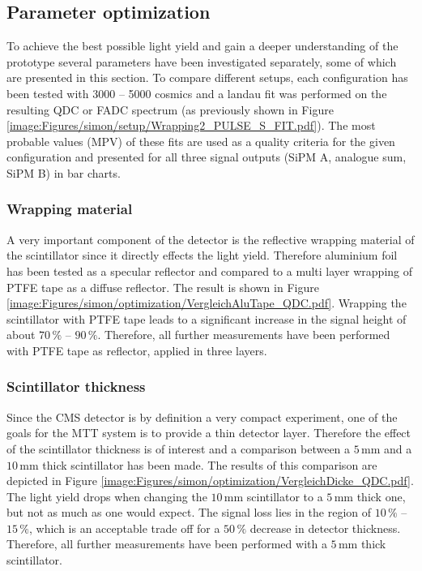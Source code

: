 \subsection{Parameter optimization}
\label{section:simon/optimization}
To achieve the best possible light yield and gain a deeper understanding of the prototype several parameters have been investigated separately, some of which are presented in this section. To compare different setups, each configuration has been tested with 3000 -- 5000 cosmics and a landau fit was performed on the resulting QDC or FADC spectrum (as previously shown in Figure \ref{image:Figures/simon/setup/Wrapping2_PULSE_S_FIT.pdf}). The most probable values (MPV) of these fits are used as a quality criteria for the given configuration and presented for all three signal outputs (SiPM A, analogue sum, SiPM B) in bar charts.
%
\subsubsection{Wrapping material}
A very important component of the detector is the reflective wrapping material of the scintillator since it directly effects the light yield. Therefore aluminium foil has been tested as a specular reflector and compared to a multi layer wrapping of PTFE tape as a diffuse reflector. The result is shown in Figure \ref{image:Figures/simon/optimization/VergleichAluTape_QDC.pdf}. Wrapping the scintillator with PTFE tape leads to a significant increase in the signal height of about $70\,\%$ -- $90\,\%$. Therefore, all further measurements have been performed with PTFE tape as reflector, applied in three layers.
%
\subsubsection{Scintillator thickness}
Since the CMS detector is by definition a very compact experiment, one of the goals for the MTT system is to provide a thin detector layer. Therefore the effect of the scintillator thickness is of interest and a comparison between a $5\,\text{mm}$ and a $10\,\text{mm}$ thick scintillator has been made. The results of this comparison are depicted in Figure \ref{image:Figures/simon/optimization/VergleichDicke_QDC.pdf}. The light yield drops when changing the $10\,\text{mm}$ scintillator to a $5\,\text{mm}$ thick one, but not as much as one would expect. The signal loss lies in the region of $10\,\%$ -- $15\,\%$, which is an acceptable trade off for a $50\,\%$ decrease in detector thickness. Therefore, all further measurements have been performed with a $5\,\text{mm}$ thick scintillator.
%
